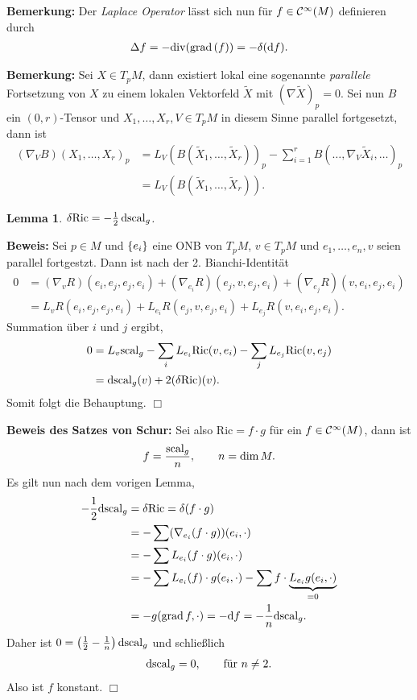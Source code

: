 \documentclass[12pt,a4paper]{article}
\def\grad{\mathrm{grad}\,}
\def\Ric{\mathrm{Ric}}
\newtheorem{Lemma}{Lemma}[section]
\def\proof{\noindent\textbf{Beweis:}\quad}
\def\qed{\quad\hfill\ensuremath{\Box}}
\begin{document}
\bigskip

{\bf Bemerkung:}
Der \emph{Laplace Operator} l\"asst sich nun f\"ur $f\in\mathcal{C}^\infty(M)$ definieren
durch
\begin{align*}
\Delta f = -\div(\grad(f)) = - \delta(\df).
\end{align*}

\bigskip

{\bf Bemerkung:}
Sei $X\in T_pM$, dann existiert lokal eine sogenannte \textit{parallele}
Fortsetzung von $X$ zu einem lokalen Vektorfeld $\tilde{X}$ mit $(\nabla \tilde{X})_p = 0$.
Sei nun $B$ ein $(0,r)$-Tensor und $X_1,\ldots,X_r,V\in T_pM$ in diesem Sinne
parallel fortgesetzt, dann ist
\begin{align*}
(\nabla_V B)(X_1,\ldots,X_r)_p &= L_V(B(\tilde{X}_1,\ldots,\tilde{X}_r))_p
- \sum_{i=1}^r B(\ldots,\nabla_V \tilde{X}_i,\ldots)_p\\
&= L_V(B(\tilde{X}_1,\ldots,\tilde{X}_r)).
\end{align*}

\bigskip

\begin{Lemma}
$\delta \Ric = - \frac{1}{2}\,\diffd\scal_g$.
\end{Lemma}
\proof
Sei $p\in M$ und $\{e_i\}$ eine ONB von $T_pM$, $v\in T_pM$ und
$e_1,\ldots,e_n,v$ seien parallel fortgestzt. Dann ist nach der 2.
Bianchi-Identit\"at
\begin{align*}
0 &= (\nabla_v R)(e_i,e_j,e_j,e_i) + 
(\nabla_{e_i} R)(e_j,v,e_j,e_i) + 
(\nabla_{e_j} R)(v,e_i,e_j,e_i)\\
&= L_v R(e_i,e_j,e_j,e_i)
+ L_{e_i} R(e_j,v,e_j,e_i)
+ L_{e_j} R(v,e_i,e_j,e_i).
\end{align*}
Summation \"uber $i$ und $j$ ergibt,
\begin{align*}
0 &= L_v \scal_g - 
\sum_{i} L_{e_i} \Ric(v,e_i)
- \sum_j L_{e_j} \Ric(v,e_j)\\
&= \diffd\scal_g(v) + 2 (\delta\Ric)(v).
\end{align*}
Somit folgt die Behauptung.
\qed

\bigskip

{\bf Beweis des Satzes von Schur:}
Sei also $\Ric = f\cdot g$ f\"ur ein $f\in \mathcal{C}^\infty(M)$, dann ist
\begin{align*}
f = \frac{\mathrm{scal}_g}{n},\qquad n = \dim M.
\end{align*}
Es gilt nun nach dem vorigen Lemma,
\begin{align*}
-\frac{1}{2}\diffd\scal_g &= \delta\Ric = \delta(f\cdot g)\\
&= -\sum  (\nabla_{e_i} (f\cdot g))(e_i,\cdot)\\
&= -\sum  L_{e_i} (f\cdot g)(e_i,\cdot)\\
&= -\sum  L_{e_i} (f)\cdot g(e_i,\cdot)-\sum  f\cdot
\underbrace{L_{e_i}g(e_i,\cdot)}_{=0}\\ &= -g(\grad f,\cdot) = -\df =
-\frac{1}{n}\diffd\scal_g.
\end{align*}
Daher ist $0 = \left(\frac{1}{2}-\frac{1}{n}\right)\mathrm{d}\mathrm{scal}_g$ und
schlie\ss{}lich
\begin{align*}
\mathrm{d}\mathrm{scal}_g = 0,\qquad \text{f\"ur }n\neq 2.
\end{align*}
Also ist $f$ konstant.
\qed
\end{document}
